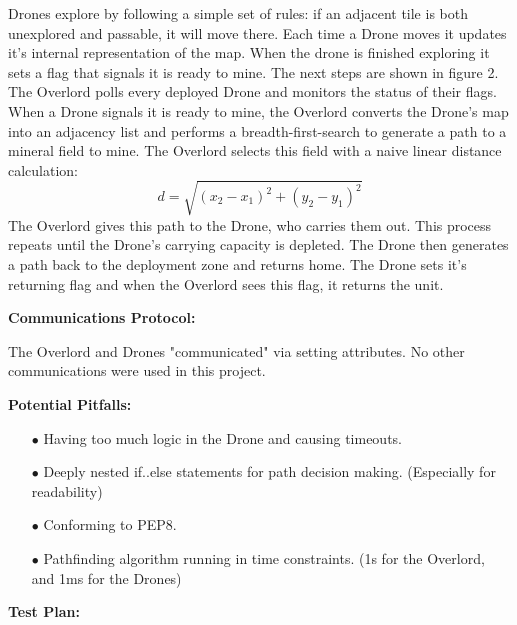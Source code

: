 \documentclass{article}
\begin{document}
Drones explore by following a simple set of rules: if an adjacent tile is
both unexplored and passable, it will move there. Each time a Drone moves
it updates it's internal representation of the map. When the drone is
finished exploring it sets a flag that signals it is ready to mine.  
The next steps are shown in figure 2.
The Overlord polls every deployed Drone and monitors the status of their 
flags.
When a Drone signals it is ready to mine, the Overlord converts the Drone's
map into an adjacency list and performs a breadth-first-search to generate 
a path to a mineral field to mine.  The Overlord selects this field with a 
naive linear distance calculation:
\[
d = \sqrt{(x_2 - x_1)^2 + (y_2 - y_1)^2} 
\]
The Overlord gives this path to the Drone, who carries them out. This process 
repeats until the Drone's carrying capacity is depleted.  The Drone then 
generates a path back to the deployment zone and returns home.  The Drone 
sets it's returning flag and when the Overlord sees this flag, it returns the 
unit.
\vspace{.5pc}

\begin{flushleft}
\textbf{Communications Protocol:}
\vspace{.5pc}
\end{flushleft}

The Overlord and Drones "communicated" via setting attributes.  No other 
communications were used in this project.
\vspace{.5pc}

\begin{flushleft}
\textbf{Potential Pitfalls:}
\vspace{.5pc}
\end{flushleft}

\begin{itemize}
	\item[$\bullet$] Having too much logic in the Drone and causing 
	timeouts.
	\item[$\bullet$] Deeply nested if..else statements for path decision
	making. (Especially for readability)
	\item[$\bullet$] Conforming to PEP8.
	\item[$\bullet$] Pathfinding algorithm running in time constraints. (1s
	for the Overlord, and 1ms for the Drones)	
\end{itemize}
\vspace{.5pc}

\begin{flushleft}
\textbf{Test Plan:}
\vspace{.5pc}
\end{flushleft}
\end{document}
